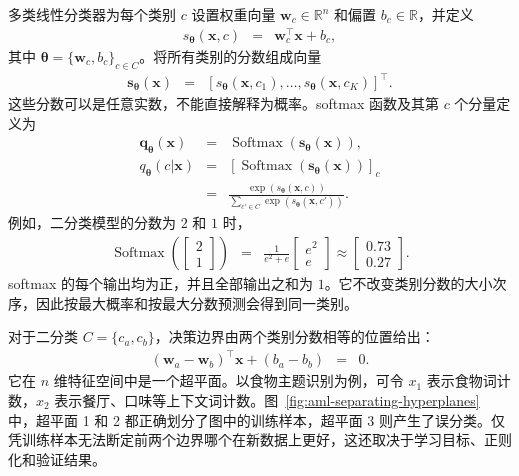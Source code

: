 多类线性分类器为每个类别 $c$ 设置权重向量 $\mathbf{w}_c\in\mathbb{R}^{n}$ 和偏置 $b_c\in\mathbb{R}$，并定义
\begin{eqnarray}
s_{\boldsymbol{\theta}}(\mathbf{x},c)
& = &
\mathbf{w}_c^{\top}\mathbf{x}+b_c,
\label{eq:sec12-linear-score}
\end{eqnarray}
其中 $\boldsymbol{\theta}=\{\mathbf{w}_c,b_c\}_{c\in C}$。将所有类别的分数组成向量
\begin{eqnarray}
\mathbf{s}_{\boldsymbol{\theta}}(\mathbf{x})
& = &
\left[
s_{\boldsymbol{\theta}}(\mathbf{x},c_1),
\ldots,
s_{\boldsymbol{\theta}}(\mathbf{x},c_K)
\right]^{\top}.
\end{eqnarray}
这些分数可以是任意实数，不能直接解释为概率。softmax 函数及其第 $c$ 个分量定义为
\begin{eqnarray}
\mathbf{q}_{\boldsymbol{\theta}}(\mathbf{x})
& = &
\operatorname{Softmax}\!\left(
\mathbf{s}_{\boldsymbol{\theta}}(\mathbf{x})
\right),\\
q_{\boldsymbol{\theta}}(c|\mathbf{x})
& = &
\left[
\operatorname{Softmax}\!\left(
\mathbf{s}_{\boldsymbol{\theta}}(\mathbf{x})
\right)
\right]_{c} \nonumber\\
& = &
\frac{\exp\!\left(s_{\boldsymbol{\theta}}(\mathbf{x},c)\right)}
{\sum_{c'\in C}\exp\!\left(s_{\boldsymbol{\theta}}(\mathbf{x},c')\right)}.
\end{eqnarray}
例如，二分类模型的分数为 $2$ 和 $1$ 时，
\begin{eqnarray}
\operatorname{Softmax}\!\left(
\begin{bmatrix}2\\1\end{bmatrix}
\right)
& = &
\frac{1}{e^2+e}
\begin{bmatrix}e^2\\e\end{bmatrix}
\approx
\begin{bmatrix}0.73\\0.27\end{bmatrix}.
\end{eqnarray}
softmax 的每个输出均为正，并且全部输出之和为 $1$。它不改变类别分数的大小次序，因此按最大概率和按最大分数预测会得到同一类别。

对于二分类 $C=\{c_a,c_b\}$，决策边界由两个类别分数相等的位置给出：
\begin{eqnarray}
(\mathbf{w}_{a}-\mathbf{w}_{b})^{\top}\mathbf{x}
+(b_a-b_b)
& = & 0.
\end{eqnarray}
它在 $n$ 维特征空间中是一个超平面。以食物主题识别为例，可令 $x_1$ 表示食物词计数，$x_2$ 表示餐厅、口味等上下文词计数。图~\ref{fig:aml-separating-hyperplanes} 中，超平面 1 和 2 都正确划分了图中的训练样本，超平面 3 则产生了误分类。仅凭训练样本无法断定前两个边界哪个在新数据上更好，这还取决于学习目标、正则化和验证结果。

